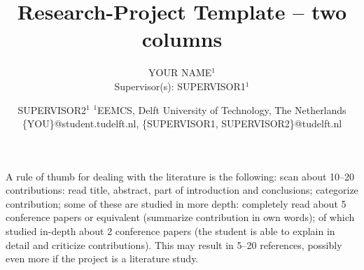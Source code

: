 \documentclass{article}
\title{Research-Project Template -- two columns}
\author{
YOUR NAME$^1$\\
Supervisor(s): SUPERVISOR1$^1$\and
SUPERVISOR2$^1$
\affiliations
$^1$EEMCS, Delft University of Technology, The Netherlands\\
\emails
\{YOU\}@student.tudelft.nl,
\{SUPERVISOR1, SUPERVISOR2\}@tudelft.nl
}
\begin{document}
\maketitle






















A rule of thumb for dealing with the literature is the following: scan about 10--20 contributions: read title, abstract, part of introduction and conclusions; categorize contribution; some of these are studied in more depth: completely read about 5 conference papers or equivalent (summarize contribution in own words); of which studied in-depth about 2 conference papers (the student is able to explain in detail and criticize contributions). This may result in 5--20 references, possibly even more if the project is a literature study.
\end{document}

